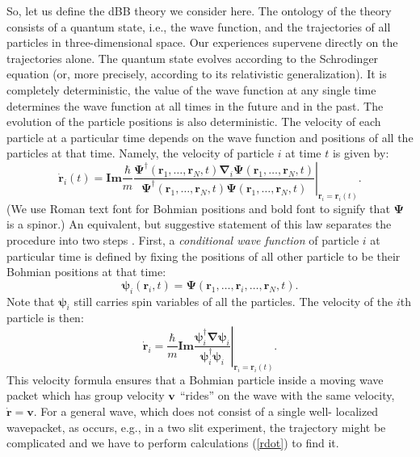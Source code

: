 \documentclass[12pt,preprint,tightenlines]{elsarticle}
\begin{document}
So, let us define the dBB theory we consider here. The ontology of
the theory consists of a quantum state, i.e., the wave function, and
the trajectories of all particles in three-dimensional space. Our
experiences supervene directly on the trajectories alone. The quantum
state evolves according to the Schrodinger equation (or, more precisely,
according to its relativistic generalization). It is completely deterministic,
the value of the wave function at any single time determines the wave
function at all times in the future and in the past. The evolution
of the particle positions is also deterministic. The velocity of each
particle at a particular time depends on the wave function and positions
of all the particles at that time. Namely, the velocity of particle
$i$ at time $t$ is given by:
 \begin{equation}
\dot{\boldsymbol{\textbf{r}}}_{i}(t)=
\textbf{Im}\frac{\hbar}{m}\left.\frac{\mathbf{\boldsymbol{\Psi}}^{\dagger}\left(\boldsymbol{r}_{1},\ldots,\boldsymbol{r}_{N},t\right)
\boldsymbol{\nabla}_{i}\boldsymbol{\Psi}\left(\boldsymbol{r}_{1},\ldots,\boldsymbol{r}_{N},t\right)}{\boldsymbol{\Psi}^{\dagger}
\left(\boldsymbol{r}_{1},\ldots,\boldsymbol{r}_{N},t\right)\boldsymbol{\Psi}\left(\boldsymbol{r}_{1},\ldots,\boldsymbol{r}_{N},t\right)}\right|_{\boldsymbol{r}_{i}=
\boldsymbol{\textbf{r}}_{i}(t)}.\label{eq:Bvel_preview}
\end{equation}
(We use Roman text font for Bohmian positions and bold font to signify
that $\mathbf{\boldsymbol{\Psi}}$ is a spinor.) An equivalent, but
suggestive statement of this law separates the procedure into two
steps \cite{Goldstein}. First, a \textit{conditional wave function}
of particle $i$ at particular time is defined by fixing the positions
of all other particle to be their Bohmian positions at that time:
\begin{equation}
\boldsymbol{\psi}_{i}(\boldsymbol{r}_{i},t)=
\boldsymbol{\Psi}\left(\boldsymbol{\textbf{r}}_{1},\ldots,\boldsymbol{r}_{i},\ldots,\boldsymbol{\textbf{r}}_{N},t\right).\label{psief}
\end{equation}
 Note that $\boldsymbol{\psi}_{i}$ still carries spin variables of
all the particles. The velocity of the $i$th particle is then:
\begin{equation}
\dot{\boldsymbol{\textbf{r}}}_{i}=
\frac{\hbar}{m}\textbf{Im}\left.\frac{\boldsymbol{\psi}_{i}^{\dagger}\boldsymbol{\nabla}\boldsymbol{\psi}_{i}}
{\boldsymbol{\psi}_{i}^{\dagger}\boldsymbol{\psi}_{i}}\right|_{\boldsymbol{r}_{i}=\boldsymbol{\textbf{r}}_{i}(t)}\label{rdot}.
\end{equation}
 This velocity formula ensures that a Bohmian particle inside a moving
wave packet which has group velocity $\bf{v}$ ``rides'' on the
wave with the same velocity, $\dot{\mathbf{r}}=\mathbf{v}$. For a
general wave, which does not consist of a single well- localized wavepacket,
as occurs, e.g., in a two slit experiment, the trajectory might be
complicated and we have to perform calculations (\ref{rdot}) to find
it.
\end{document}
